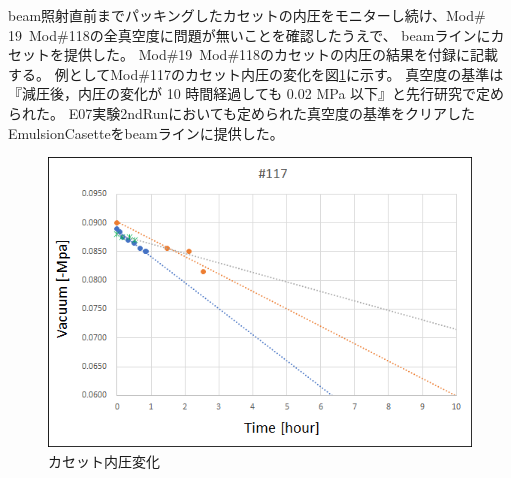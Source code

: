 \documentclass[12pt,a4paper]{jarticle}
\begin{document}
beam照射直前までパッキングしたカセットの内圧をモニターし続け、Mod$\#$19~Mod$\#$118の全真空度に問題が無いことを確認したうえで、
beamラインにカセットを提供した。
Mod$\#$19~Mod$\#$118のカセットの内圧の結果を付録に記載する。
例としてMod$\#$117のカセット内圧の変化を図\ref{fig:casette_bakyu-mu}に示す。
真空度の基準は『減圧後，内圧の変化が 10 時間経過しても 0.02 MPa 以下』と先行研究で定められた。\cite{endo}
E07実験2ndRunにおいても定められた真空度の基準をクリアしたEmulsionCasetteをbeamラインに提供した。
\begin{figure}[htbp]
  \centering
     \includegraphics[width=140mm]{vacuum117.png}
  \caption{カセット内圧変化\label{fig:casette_bakyu-mu}}
\end{figure}
\newpage
\end{document}
